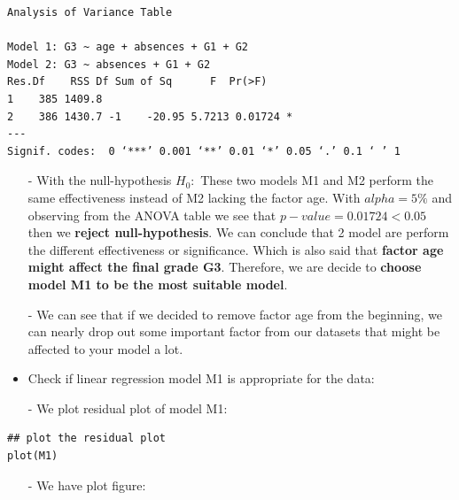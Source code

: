\documentclass[a4paper]{article}
\numberwithin{equation}{section}
\begin{document}
\begin{mdframed}[leftline=false,rightline=false,backgroundcolor=gray!10,nobreak=true]
  \begin{verbatim}
Analysis of Variance Table

Model 1: G3 ~ age + absences + G1 + G2
Model 2: G3 ~ absences + G1 + G2
Res.Df    RSS Df Sum of Sq      F  Pr(>F)
1    385 1409.8
2    386 1430.7 -1    -20.95 5.7213 0.01724 *
---
Signif. codes:  0 ‘***’ 0.001 ‘**’ 0.01 ‘*’ 0.05 ‘.’ 0.1 ‘ ’ 1
  \end{verbatim}
\end{mdframed}
\begin{itemize}
  \item[-] With the null-hypothesis \(H_0:\) These two models M1 and M2 perform the same effectiveness instead of M2 lacking the factor age. With \(alpha = 5\%\) and observing from the ANOVA table we see that \(p-value = 0.01724 < 0.05\) then we \textbf{reject null-hypothesis}. We can conclude that 2 model are perform the different effectiveness or significance. Which is also said that \textbf{factor age might affect the final grade G3}. Therefore, we are decide to \textbf{choose model M1 to be the most suitable model}.
  \item[-] We can see that if we decided to remove factor age from the beginning, we can nearly drop out some important factor from our datasets that might be affected to your model a lot.
\end{itemize}

\begin{itemize}
  \item Check if linear regression model M1 is appropriate for the data:
\end{itemize}

\begin{itemize}
  \item[-] We plot residual plot of model M1:
\end{itemize}

\begin{mdframed}[leftline=false,rightline=false,backgroundcolor=magenta!10,nobreak=true]
  \begin{verbatim}
## plot the residual plot
plot(M1)
  \end{verbatim}
\end{mdframed}
\begin{itemize}
  \item[-] We have plot figure:
\end{itemize}
\end{document}
